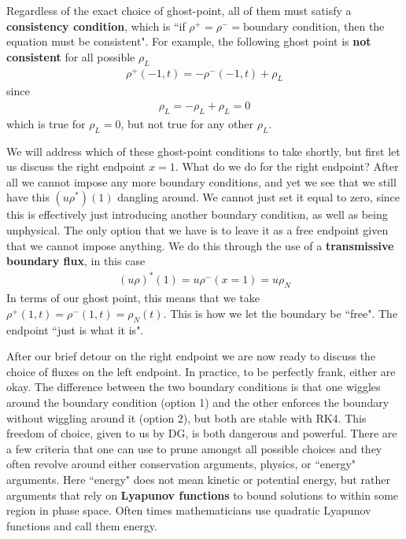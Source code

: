 \documentclass{report}
\numberwithin{equation}{section}
\begin{document}
Regardless of the exact choice of ghost-point, all of them must satisfy a \textbf{consistency condition}, which is ``if $\rho^+ = \rho^- = \text{boundary condition}$, then the equation must be consistent". For example, the following ghost point is \textbf{not consistent} for all possible $\rho_L$
\begin{align}
    \rho^+(-1,t) = - \rho^-(-1,t) +  \rho_L
\end{align}
since 
\begin{align}
    \rho_L = - \rho_L +  \rho_L = 0
\end{align}
which is true for $\rho_L = 0$, but not true for any other $\rho_L$.

We will address which of these ghost-point conditions to take shortly, but first let us discuss the right endpoint $x = 1$. What do we do for the right endpoint? After all we cannot impose any more boundary conditions, and yet we see that we still have this $(u\rho^*)(1)$ dangling around. We cannot just set it equal to zero, since this is effectively just introducing another boundary condition, as well as being unphysical. The only option that we have is to leave it as a free endpoint given that we cannot impose anything. We do this through the use of a \textbf{transmissive boundary flux}, in this case
\begin{align}
    (u \rho)^*(1) = u \rho^-(x = 1) = u \rho_N
\end{align}
In terms of our ghost point, this means that we take $ \rho^+(1,t) = \rho^-(1,t) = \rho_N(t)$. This is how we let the boundary be ``free". The endpoint ``just is what it is".  

After our brief detour on the right endpoint we are now ready to discuss the choice of fluxes on the left endpoint. In practice, to be perfectly frank, either are okay. The difference between the two boundary conditions is that one wiggles around the boundary condition (option 1) and the other enforces the boundary without wiggling around it (option 2), but both are stable with RK4. This freedom of choice, given to us by DG, is both dangerous and powerful. There are a few criteria that one can use to prune amongst all possible choices and they often revolve around either conservation arguments, physics, or ``energy" arguments. Here ``energy" does not mean kinetic or potential energy, but rather arguments that rely on \textbf{Lyapunov functions} to bound solutions to within some region in phase space. Often times mathematicians use quadratic Lyapunov functions and call them energy. 
\end{document}
